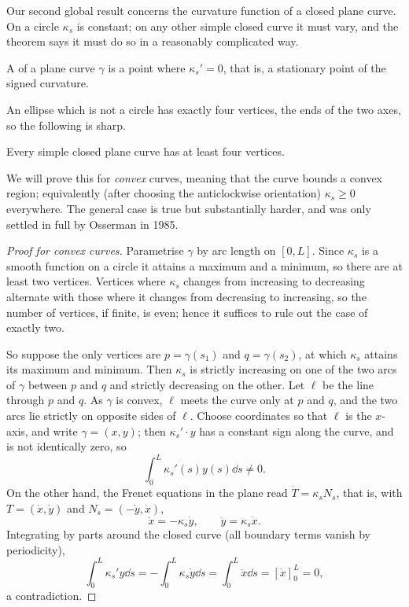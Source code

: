 Our second global result concerns the curvature function of a closed plane curve. On a circle $\kappa_s$ is constant; on any other simple closed curve it must vary, and the theorem says it must do so in a reasonably complicated way.

\begin{definition}[Vertex]
    A  of a plane curve $\gamma$ is a point where $\kappa_s' = 0$, that is, a stationary point of the signed curvature.
\end{definition}

An ellipse which is not a circle has exactly four vertices, the ends of the two axes, so the following is sharp.

\begin{theorem}
    Every simple closed plane curve has at least four vertices.
\end{theorem}

We will prove this for \emph{convex} curves, meaning that the curve bounds a convex region; equivalently (after choosing the anticlockwise orientation) $\kappa_s \geq 0$ everywhere. The general case is true but substantially harder, and was only settled in full by Osserman in 1985.

\begin{proof}[Proof for convex curves]
    Parametrise $\gamma$ by arc length on $[0, L]$. Since $\kappa_s$ is a smooth function on a circle it attains a maximum and a minimum, so there are at least two vertices. Vertices where $\kappa_s$ changes from increasing to decreasing alternate with those where it changes from decreasing to increasing, so the number of vertices, if finite, is even; hence it suffices to rule out the case of exactly two.

    So suppose the only vertices are $p = \gamma(s_1)$ and $q = \gamma(s_2)$, at which $\kappa_s$ attains its maximum and minimum. Then $\kappa_s$ is strictly increasing on one of the two arcs of $\gamma$ between $p$ and $q$ and strictly decreasing on the other. Let $\ell$ be the line through $p$ and $q$. As $\gamma$ is convex, $\ell$ meets the curve only at $p$ and $q$, and the two arcs lie strictly on opposite sides of $\ell$. Choose coordinates so that $\ell$ is the $x$-axis, and write $\gamma = (x,y)$; then $\kappa_s' \cdot y$ has a constant sign along the curve, and is not identically zero, so
    $$
    \int_0^L \kappa_s'(s) y(s) \dd s \neq 0.
    $$
    On the other hand, the Frenet equations in the plane read $\dot T = \kappa_s N_s$, that is, with $T = (\dot x, \dot y)$ and $N_s = (-\dot y, \dot x)$,
    $$
    \ddot x = -\kappa_s \dot y, \qquad \ddot y = \kappa_s \dot x.
    $$
    Integrating by parts around the closed curve (all boundary terms vanish by periodicity),
    $$
    \int_0^L \kappa_s' y \dd s = -\int_0^L \kappa_s \dot y \dd s = \int_0^L \ddot x \dd s = \left[\dot x\right]_0^L = 0,
    $$
    a contradiction.
\end{proof}

